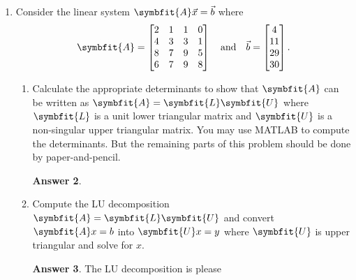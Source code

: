 \documentclass{article}
\theoremstyle{definition}
\newtheorem*{answer}{Answer}
\newcommand{\mat}[1]{\symbfit{#1}}
\begin{document}
\begin{enumerate}[leftmargin=\labelsep]
\begin{enumerate}
\begin{answer}
			            Then, an algorithm to quickly solve this problem can be found in \cref{alg:quick-solve}.
			            \begin{algorithm}
				            \caption{An algorithm to quickly solve \((\mat{A} + \vec{u}\vec{v}^\top)\vec{y} = \vec{c}\) given an algorithm to quickly solve \(\mat{A}\vec{x} = \vec{b}\).}
				            \label{alg:quick-solve}
				            \KwData{\(\mat{A},\ \vec{c},\ \vec{u},\ \vec{v}\)}
				            \KwResult{\(\vec{y} = (\mat{A} + \vec{u}\vec{v}^\top)^{-1}\vec{c}\)}
				            Solve \(\mat{A}\vec{w} = \vec{c}\)\;
				            Solve \(\mat{A}\vec{x} = \vec{u}\)\;
				            \(\vec{y} \gets \vec{w} - \vec{x}\vec{v}^\top\vec{w}/(1 + \vec{v}^\top \vec{x})\)\;
			            \end{algorithm}

		            \end{answer}

	      \end{enumerate}

	\item Consider the linear system \(\mat{A}\vec{x} = \vec{b}\) where
	      \[
		      \mat{A} = \begin{bmatrix}
			      2 & 1 & 1 & 0 \\
			      4 & 3 & 3 & 1 \\
			      8 & 7 & 9 & 5 \\
			      6 & 7 & 9 & 8
		      \end{bmatrix}
		      \quad \text{and} \quad
		      \vec{b} = \begin{bmatrix}
			      4 \\ 11 \\ 29 \\ 30
		      \end{bmatrix}.
	      \]
	      \begin{enumerate}
		      \item Calculate the appropriate determinants to show that \(\mat{A}\) can be written as \(\mat{A} = \mat{L}\mat{U}\) where \(\mat{L}\) is a unit lower triangular matrix and \(\mat{U}\) is a non-singular upper triangular matrix. You may use MATLAB to compute the determinants. But the remaining parts of this problem should be done by paper-and-pencil.
		            \begin{answer}

		            \end{answer}

		      \item Compute the LU decomposition \(\mat{A} = \mat{L}\mat{U}\) and convert \(\mat{A}x = b\) into \(\mat{U}x = y\) where \(\mat{U}\) is upper triangular and solve for \(x\).
		            \begin{answer}
			            The LU decomposition is please
		            \end{answer}


\end{enumerate}
\end{enumerate}
\end{document}
